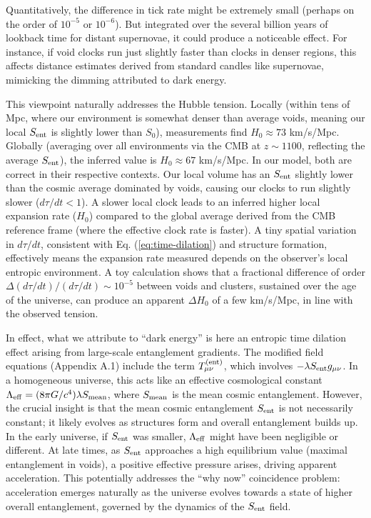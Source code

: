 \documentclass[11pt]{article}
\begin{document}
Quantitatively, the difference in tick rate might be extremely small (perhaps on the order of $10^{-5}$ or $10^{-6}$). But integrated over the several billion years of lookback time for distant supernovae, it could produce a noticeable effect. For instance, if void clocks run just slightly faster than clocks in denser regions, this affects distance estimates derived from standard candles like supernovae, mimicking the dimming attributed to dark energy.

This viewpoint naturally addresses the Hubble tension. Locally (within tens of Mpc, where our environment is somewhat denser than average voids, meaning our local $S_{\rm ent}$ is slightly lower than $S_0$), measurements find $H_0 \approx 73$ km/s/Mpc. Globally (averaging over all environments via the CMB at $z \sim 1100$, reflecting the average $S_{\rm ent}$), the inferred value is $H_0 \approx 67$ km/s/Mpc. In our model, both are correct in their respective contexts. Our local volume has an $S_{\rm ent}$ slightly lower than the cosmic average dominated by voids, causing our clocks to run slightly slower ($d\tau/dt < 1$). A slower local clock leads to an inferred higher local expansion rate ($H_0$) compared to the global average derived from the CMB reference frame (where the effective clock rate is faster). A tiny spatial variation in $d\tau/dt$, consistent with Eq. (\ref{eq:time-dilation}) and structure formation, effectively means the expansion rate measured depends on the observer's local entropic environment. A toy calculation shows that a fractional difference of order $\Delta(d\tau/dt)/(d\tau/dt) \sim 10^{-5}$ between voids and clusters, sustained over the age of the universe, can produce an apparent $\Delta H_0$ of a few km/s/Mpc, in line with the observed tension.

In effect, what we attribute to “dark energy” is here an entropic time dilation effect arising from large-scale entanglement gradients. The modified field equations (Appendix A.1) include the term $T_{\mu\nu}^{\rm (ent)}$, which involves $-\lambda S_{\rm ent} g_{\mu\nu}$. In a homogeneous universe, this acts like an effective cosmological constant $\Lambda_{\rm eff} = (8\pi G / c^4) \lambda S_{\rm mean}$, where $S_{\rm mean}$ is the mean cosmic entanglement. However, the crucial insight is that the mean cosmic entanglement $S_{\rm ent}$ is not necessarily constant; it likely evolves as structures form and overall entanglement builds up. In the early universe, if $S_{\rm ent}$ was smaller, $\Lambda_{\rm eff}$ might have been negligible or different. At late times, as $S_{\rm ent}$ approaches a high equilibrium value (maximal entanglement in voids), a positive effective pressure arises, driving apparent acceleration. This potentially addresses the “why now” coincidence problem: acceleration emerges naturally as the universe evolves towards a state of higher overall entanglement, governed by the dynamics of the $S_{\rm ent}$ field.
\end{document}
